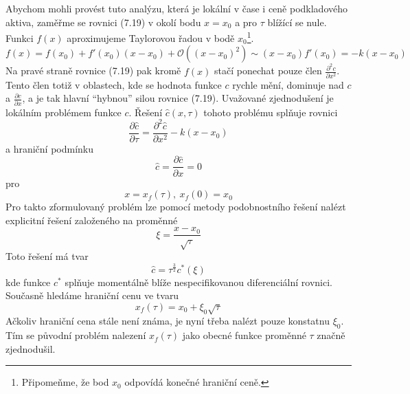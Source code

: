 \documentclass[a4paper]{book}
\begin{document}
Abychom mohli provést tuto analýzu, která je lokální v čase i ceně podkladového aktiva, zaměřme se rovnici (7.19) v okolí bodu $x = x_0$ a pro $\tau$ blížící se nule. Funkci $f(x)$ aproximujeme Taylorovou řadou v bodě $x_0$\footnote{Připomeňme, že bod $x_0$ odpovídá konečné hraniční ceně.}.
\begin{equation*}
f(x) = f(x_0) + f'(x_0)(x - x_0) + \mathcal{O}((x - x_0)^2) \sim (x - x_0)f'(x_0) = -k(x - x_0)
\end{equation*}
Na pravé straně rovnice (7.19) pak kromě $f(x)$ stačí ponechat pouze člen $\frac{\partial^2 c}{\partial x^2}$. Tento člen totiž v oblastech, kde se hodnota funkce $c$ rychle mění, dominuje nad $c$ a $\frac{\partial c}{\partial x}$, a je tak hlavní ``hybnou'' silou rovnice (7.19). Uvažované zjednodušení je lokálním problémem funkce $c$. Řešení $\hat{c}(x, \tau)$ tohoto problému splňuje rovnici
\begin{equation*}
\frac{\partial \hat{c}}{\partial \tau} = \frac{\partial^2 \hat{c}}{\partial x^2} - k(x - x_0)
\end{equation*}
a hraniční podmínku
\begin{equation*}
\hat{c} = \frac{\partial \hat{c}}{\partial x} = 0
\end{equation*}
pro
\begin{equation*}
x = x_f(\tau),~x_f(0) = x_0
\end{equation*}
Pro takto zformulovaný problém lze pomocí metody podobnostního řešení nalézt explicitní řešení založeného na proměnné
\begin{equation*}
\xi = \frac{x - x_0}{\sqrt{\tau}}
\end{equation*}
Toto řešení má tvar
\begin{equation*}
\hat{c} = \tau^{\frac{3}{2}}c^*(\xi)
\end{equation*}
kde funkce $c^*$ splňuje momentálně blíže nespecifikovanou diferenciální rovnici. Současně hledáme hraniční cenu ve tvaru
\begin{equation*}
x_f(\tau) = x_0 + \xi_0 \sqrt{\tau}
\end{equation*}
Ačkoliv hraniční cena stále není známa, je nyní třeba nalézt pouze konstatnu $\xi_0$. Tím se původní problém nalezení $x_f(\tau)$ jako obecné funkce proměnné $\tau$ značně zjednodušil. 
\end{document}
